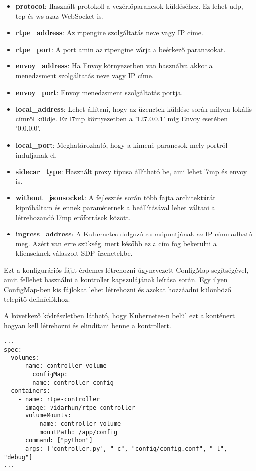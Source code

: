 \begin{itemize}
	\item \textbf{protocol}: Használt protokoll a vezérlőparancsok küldéséhez. Ez lehet
	udp, tcp és ws azaz WebSocket is.
	\item \textbf{rtpe\_address}: Az rtpengine szolgáltatás neve vagy IP címe. 
	\item \textbf{rtpe\_port}: A port amin az rtpengine várja a beérkező parancsokat. 
	\item \textbf{envoy\_address}: Ha Envoy környezetben van használva akkor a menedzsment
	szolgáltatás neve vagy IP címe. 
	\item \textbf{envoy\_port}: Envoy menedzsment szolgáltatás portja. 
	\item \textbf{local\_address}: Lehet állítani, hogy az üzenetek küldése során milyen
	lokális címről küldje. Ez l7mp környezetben a '127.0.0.1' míg Envoy esetében '0.0.0.0'.
	\item \textbf{local\_port}: Meghatározható, hogy a kimenő parancsok mely portról
	induljanak el. 
	\item \textbf{sidecar\_type}: Használt proxy típusa állítható be, ami lehet l7mp és envoy is.
	\item \textbf{without\_jsonsocket}: A fejlesztés során több fajta architektúrát kipróbáltam
	és ennek paraméternek a beállításával lehet váltani a létrehozandó l7mp erőforrások között. 
	\item \textbf{ingress\_address}: A Kubernetes dolgozó csomópontjának az IP címe adható meg.
	Azért van erre szükség, mert később ez a cím fog bekerülni a klienseknek válaszolt SDP
	üzenetekbe. 
\end{itemize}

Ezt a konfigurációs fájlt érdemes létrehozni úgynevezett ConfigMap segítségével, amit fellehet
használni a kontroller kapszulájának leírása során. Egy ilyen ConfigMap-ben kis fájlokat 
lehet létrehozni és azokat hozzáadni különböző telepítő definíciókhoz. 

A következő kódrészletben látható, hogy Kubernetes-n belül ezt a konténert hogyan kell 
létrehozni és elindítani benne a kontrollert. 

\begin{lstlisting}
...
spec:
  volumes:
    - name: controller-volume
        configMap:
        name: controller-config
  containers:
    - name: rtpe-controller
      image: vidarhun/rtpe-controller
      volumeMounts:
        - name: controller-volume
          mountPath: /app/config
      command: ["python"]
      args: ["controller.py", "-c", "config/config.conf", "-l", "debug"]
...
\end{lstlisting}

